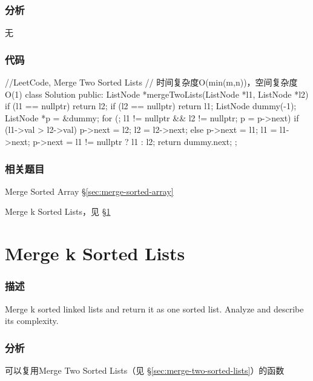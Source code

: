\subsubsection{分析}
无


\subsubsection{代码}
\begin{Code}
	//LeetCode, Merge Two Sorted Lists
	// 时间复杂度O(min(m,n))，空间复杂度O(1)
	class Solution {
		public:
		ListNode *mergeTwoLists(ListNode *l1, ListNode *l2) {
			if (l1 == nullptr) return l2;
			if (l2 == nullptr) return l1;
			ListNode dummy(-1);
			ListNode *p = &dummy;
			for (; l1 != nullptr && l2 != nullptr; p = p->next) {
				if (l1->val > l2->val) { p->next = l2; l2 = l2->next; }
				else { p->next = l1; l1 = l1->next; }
			}
			p->next = l1 != nullptr ? l1 : l2;
			return dummy.next;
		}
	};
\end{Code}


\subsubsection{相关题目}
\begindot
\item Merge Sorted Array \S \ref{sec:merge-sorted-array}
\item Merge k Sorted Lists，见 \S \ref{sec:merge-k-sorted-lists}
\myenddot


\section{Merge k Sorted Lists} %
\label{sec:merge-k-sorted-lists}


\subsubsection{描述}
Merge k sorted linked lists and return it as one sorted list. Analyze and describe its complexity.


\subsubsection{分析}
可以复用Merge Two Sorted Lists（见 \S \ref{sec:merge-two-sorted-lists}）的函数


